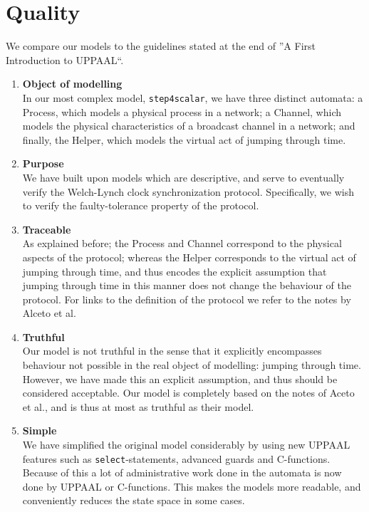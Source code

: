 \documentclass[a4paper,10pt]{article}
\newcommand{\UPPAAL}{UPPAAL\xspace}
\begin{document}
\section{Quality\label{sec:quality}}


We compare our models to the guidelines stated at the end of ''A First Introduction to UPPAAL``. \cite{Vaandrager2011First}

\begin{enumerate}
\item \textbf{Object of modelling} \\
	In our most complex model, \texttt{step4scalar}, we have three distinct automata: a Process, which models a physical process in a network; a Channel, which models the physical characteristics of a broadcast channel in a network; and finally, the Helper, which models the virtual act of jumping through time.
\item \textbf{Purpose} \\
	We have built upon models which are descriptive, and serve to eventually verify the Welch-Lynch clock synchronization protocol. Specifically, we wish to verify the faulty-tolerance property of the protocol.
\item \textbf{Traceable} \\
	As explained before; the Process and Channel correspond to the physical aspects of the protocol; whereas the Helper corresponds to the virtual act of jumping through time, and thus encodes the explicit assumption that jumping through time in this manner does not change the behaviour of the protocol. For links to the definition of the protocol we refer to the notes by Alceto et al. \cite{Aceto2004Notes}
\item \textbf{Truthful} \\
	Our model is not truthful in the sense that it explicitly encompasses behaviour not possible in the real object of modelling: jumping through time. However, we have made this an explicit assumption, and thus should be considered acceptable. Our model is completely based on the notes of Aceto et al., and is thus at most as truthful as their model.
\item \textbf{Simple} \\
	We have simplified the original model considerably by using new \UPPAAL features such as \texttt{select}-statements, advanced guards and C-functions. Because of this a lot of administrative work done in the automata is now done by \UPPAAL or C-functions. This makes the models more readable, and conveniently reduces the state space in some cases.

\end{enumerate}
\end{document}
